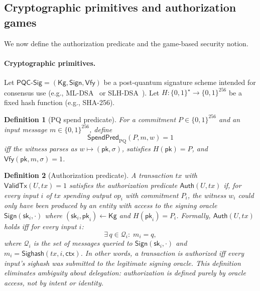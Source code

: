 \documentclass[11pt]{article}
\newtheorem{definition}{Definition}
\newcommand{\bits}{\{0,1\}}
\newcommand{\PQC}{\mathsf{PQC}}
\newcommand{\Sighash}{\mathsf{Sighash}}
\newcommand{\ValidTx}{\mathsf{ValidTx}}
\newcommand{\SpendPred}{\mathsf{SpendPred}}
\newcommand{\SpendPredPQ}{\SpendPred_{\mathrm{PQ}}}
\begin{document}
\subsection{Cryptographic primitives and authorization games}\label{sec:auth-games}

We now define the authorization predicate and the game-based security notion.

\paragraph{Cryptographic primitives.}
Let $\PQC\textsf{-Sig}=(\mathsf{Kg},\mathsf{Sign},\mathsf{Vfy})$ be a post-quantum signature scheme intended for consensus use (e.g., ML-DSA~\cite{fips204} or SLH-DSA~\cite{fips205}).
Let $H:\bits^\star\to\bits^{256}$ be a fixed hash function (e.g., SHA-256).

\begin{definition}[PQ spend predicate]
For a commitment $P\in\bits^{256}$ and an input message $m\in\bits^{256}$, define
\[
\SpendPredPQ(P,m,w)=1
\]
iff the witness parses as $w\mapsto (\mathsf{pk},\sigma)$, satisfies $H(\mathsf{pk})=P$, and $\mathsf{Vfy}(\mathsf{pk},m,\sigma)=1$.
\end{definition}

\begin{definition}[Authorization predicate]\label{def:auth-pred}
A transaction $tx$ with $\ValidTx(U,tx)=1$ satisfies the \emph{authorization predicate} $\mathsf{Auth}(U,tx)$ if, for every input $i$ of $tx$ spending output $op_i$ with commitment $P_i$, the witness $w_i$ could only have been produced by an entity with access to the signing oracle $\mathsf{Sign}(\mathsf{sk}_i,\cdot)$ where $(\mathsf{sk}_i,\mathsf{pk}_i)\gets\mathsf{Kg}$ and $H(\mathsf{pk}_i)=P_i$.
Formally, $\mathsf{Auth}(U,tx)$ holds iff for every input $i$:
\[
\exists\, q \in \mathcal{Q}_i:\; m_i = q,
\]
where $\mathcal{Q}_i$ is the set of messages queried to $\mathsf{Sign}(\mathsf{sk}_i,\cdot)$ and $m_i=\Sighash(tx,i,\textsf{ctx})$.
In other words, a transaction is authorized iff every input's sighash was submitted to the legitimate signing oracle.
This definition eliminates ambiguity about delegation: authorization is defined purely by oracle access, not by intent or identity.
\end{definition}
\end{document}
